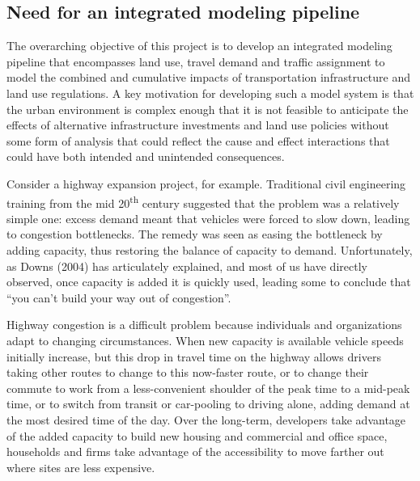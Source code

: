 \subsection{Need for an integrated modeling pipeline}

The overarching objective of this project is to develop an integrated modeling pipeline that encompasses land use, travel demand and traffic assignment to model the combined and cumulative impacts of transportation infrastructure and land use regulations. A key motivation for developing such a model system is that the urban environment
is complex enough that it is not feasible to anticipate the effects of alternative infrastructure investments and land use policies without some form of analysis that could reflect the cause and effect interactions that could have both intended and unintended consequences.

Consider a highway expansion project, for example. Traditional civil engineering training from the mid 20\textsuperscript{th} century suggested that the problem was a relatively simple one: excess demand meant that vehicles were forced to slow down, leading to congestion bottlenecks. The remedy was seen as easing the bottleneck by adding capacity, thus restoring the balance of capacity to demand. Unfortunately, as Downs (2004) has articulately explained, and most of us have directly observed, once capacity is added it is quickly used, leading some to conclude that \enquote{you can't build your way out of congestion}.

Highway congestion is a difficult problem because individuals and organizations adapt to changing circumstances. When new capacity is available vehicle speeds initially increase, but this drop in travel time on the highway allows drivers taking other routes to change to this now-faster route, or to change their commute to work from a less-convenient shoulder of the peak time to a mid-peak time, or to switch from transit or car-pooling to driving alone, adding demand at the most desired time of the day. Over the long-term, developers take advantage of the added capacity to build new housing and commercial and office space, households and firms take advantage of the accessibility to move farther out where sites are less expensive.


